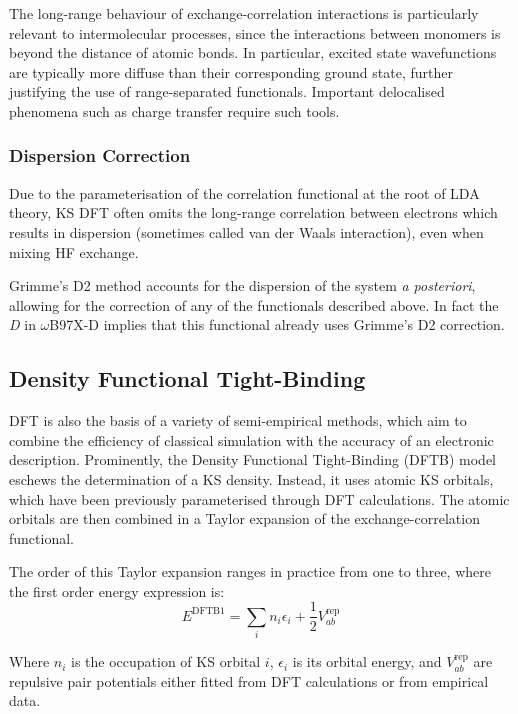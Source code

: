 The long-range behaviour of exchange-correlation interactions is particularly relevant to intermolecular processes, since the interactions between monomers is beyond the distance of atomic bonds. In particular, excited state wavefunctions are typically more diffuse than their corresponding ground state, further justifying the use of range-separated functionals. Important delocalised phenomena such as charge transfer require such tools.


\subsubsection{Dispersion Correction}
Due to the parameterisation of the correlation functional at the root of LDA theory, KS DFT often omits the long-range correlation between electrons which results in dispersion (sometimes called van der Waals interaction), even when mixing HF exchange.

Grimme's D2 method\cite{Grimme2006} accounts for the dispersion of the system \textit{a posteriori}, allowing for the correction of any of the functionals described above. In fact the \textit{D} in $\omega$B97X-D implies that this functional already uses Grimme's D2 correction.

\subsection{Density Functional Tight-Binding}

DFT is also the basis of a variety of semi-empirical methods, which aim to combine the efficiency of classical simulation with the accuracy of an electronic description. Prominently, the Density Functional Tight-Binding (DFTB) model eschews the determination of a KS density. Instead, it uses atomic KS orbitals, which have been previously parameterised through DFT calculations. The atomic orbitals are then combined in a Taylor expansion of the exchange-correlation functional.\cite{Foulkes1989,Seifert2012}

The order of this Taylor expansion ranges in practice from one to three, where the first order energy expression is:
\begin{equation}
    E^{\text{DFTB1}}=\sum_{i}n_i \epsilon_i + \frac{1}{2}V^{\text{rep}}_{ab}
\end{equation}

Where $n_i$ is the occupation of KS orbital $i$, $\epsilon_i$ is its orbital energy, and $V^{\text{rep}}_{ab}$ are repulsive pair potentials either fitted from DFT calculations or from empirical data.\cite{Elstner1998}

